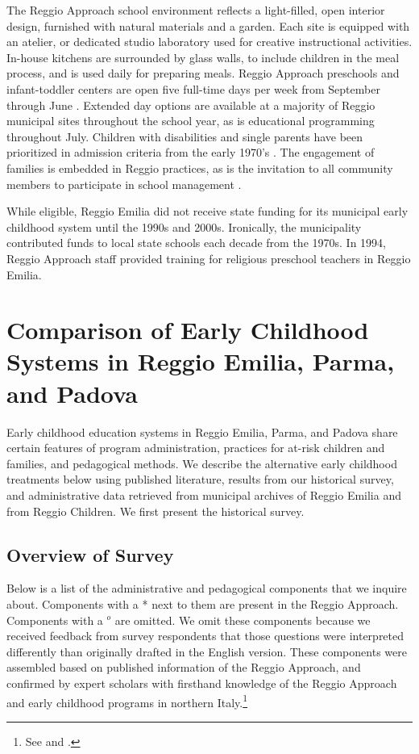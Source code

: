 The Reggio Approach school environment reflects a light-filled, open interior design, furnished with natural materials and a garden. Each site is equipped with an atelier, or dedicated studio laboratory used for creative instructional activities. In-house kitchens are surrounded by glass walls, to include children in the meal process, and is used daily for preparing meals. Reggio Approach preschools and infant-toddler centers are open five full-time days per week from September through June \citep{Giudici-Nicolosi_2014_Reggio-Approach}. Extended day options are available at a majority of Reggio municipal sites throughout the school year, as is educational programming throughout July. Children with disabilities and single parents have been prioritized in admission criteria from the early 1970's \citep{Edwards-etal-eds_1998_Hundred-Languages}. The engagement of families is embedded in Reggio practices, as is the invitation to all community members to participate in school management \citep{CEHD_2016_Historical-Analysis,Cagliari-etal-eds_2016_BOOK_Loris-Malaguzzi}. 

While eligible, Reggio Emilia did not receive state funding for its municipal early childhood system until the 1990s and 2000s. Ironically, the municipality contributed funds to local state schools each decade from the 1970s. In 1994, Reggio Approach staff provided training for religious preschool teachers in Reggio Emilia.  

\section{Comparison of Early Childhood Systems in Reggio Emilia, Parma, and Padova}

Early childhood education systems in Reggio Emilia, Parma, and Padova share certain features of program administration, practices for at-risk children and families, and pedagogical methods. We describe the alternative early childhood treatments below using published literature, results from our historical survey, and administrative data retrieved from municipal archives of Reggio Emilia and from Reggio Children. We first present the historical survey.

\subsection{Overview of Survey} \label{sec:survey-overview}
Below is a list of the administrative and pedagogical components that we inquire about. Components with a * next to them are present in the Reggio Approach. Components with a $^o$ are omitted. We omit these components because we received feedback from survey respondents that those questions were interpreted differently than originally drafted in the English version. These components were assembled based on published information of the Reggio Approach, and confirmed by expert scholars with firsthand knowledge of the Reggio Approach and early childhood programs in northern Italy.\footnote{See \citet{Edwards-etal-eds_1998_Hundred-Languages} and \citet{Corsaro_2008_Policy-Practice}.}

